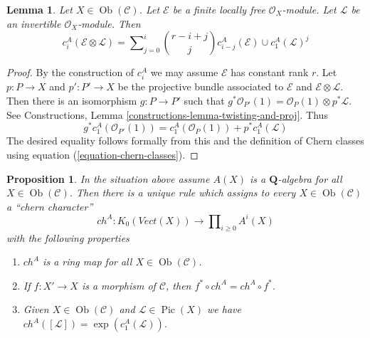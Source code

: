 \documentclass{stacks-project}
\theoremstyle{plain}
\newtheorem{proposition}[subsection]{Proposition}
\newtheorem{lemma}[subsection]{Lemma}
\theoremstyle{definition}
\theoremstyle{remark}
\numberwithin{equation}{subsection}
\def\Ob{\mathop{\mathrm{Ob}}\nolimits}
\def\Pic{\mathop{\mathrm{Pic}}\nolimits}
\begin{document}
\begin{lemma}
\label{lemma-chern-classes-E-tensor-L}
Let $X \in \Ob(\mathcal{C})$. Let $\mathcal{E}$ be a finite locally free
$\mathcal{O}_X$-module. Let $\mathcal{L}$ be an invertible
$\mathcal{O}_X$-module. Then
$$
c^A_i({\mathcal E} \otimes {\mathcal L})
=
\sum\nolimits_{j = 0}^i
\binom{r - i + j}{j} c^A_{i - j}({\mathcal E}) \cup c^A_1({\mathcal L})^j
$$
\end{lemma}

\begin{proof}
By the construction of $c^A_i$ we may assume $\mathcal{E}$ has
constant rank $r$. Let $p : P \to X$ and $p' : P' \to X$ be the
projective bundle associated to $\mathcal{E}$ and
$\mathcal{E} \otimes \mathcal{L}$.
Then there is an isomorphism $g : P \to P'$ such that
$g^*\mathcal{O}_{P'}(1) = \mathcal{O}_P(1) \otimes p^*\mathcal{L}$.
See Constructions, Lemma \ref{constructions-lemma-twisting-and-proj}.
Thus
$$
g^*c_1^A(\mathcal{O}_{P'}(1)) =
c_1^A(\mathcal{O}_P(1)) + p^*c_1^A(\mathcal{L})
$$
The desired equality follows formally from this and the definition
of Chern classes using equation (\ref{equation-chern-classes}).
\end{proof}

\begin{proposition}
\label{proposition-chern-character}
In the situation above assume $A(X)$ is a $\mathbf{Q}$-algebra for all
$X \in \Ob(\mathcal{C})$. Then there is a unique rule which assigns to
every $X \in \Ob(\mathcal{C})$ a ``chern character''
$$
ch^A : K_0(\textit{Vect}(X)) \longrightarrow
\prod\nolimits_{i \geq 0} A^i(X)
$$
with the following properties
\begin{enumerate}
\item $ch^A$ is a ring map for all $X \in \Ob(\mathcal{C})$.
\item If $f : X' \to X$ is a morphism of $\mathcal{C}$, then
$f^* \circ ch^A =  ch^A \circ f^*$.
\item Given $X \in \Ob(\mathcal{C})$ and $\mathcal{L} \in \Pic(X)$
we have $ch^A([\mathcal{L}]) = \exp(c_1^A(\mathcal{L}))$.
\end{enumerate}
\end{proposition}
\end{document}
